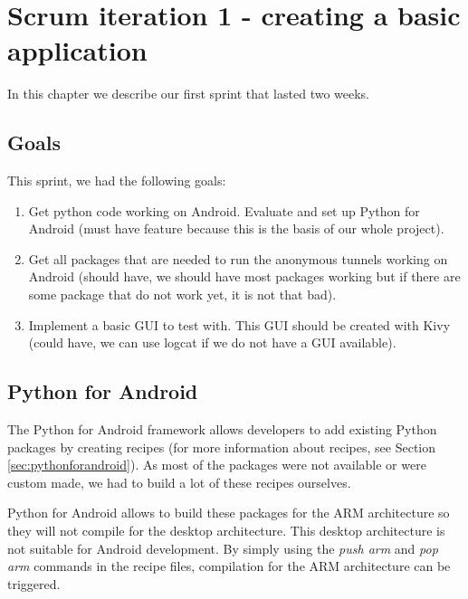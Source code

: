 \chapter{Scrum iteration 1 - creating a basic application}
\label{cpt:iteration1}
	In this chapter we describe our first sprint that lasted two weeks.

	\section{Goals}
		This sprint, we had the following goals:
	
		\begin{enumerate}
			\item Get python code working on Android. Evaluate and set up Python for Android (must have feature because this is the basis of our whole project).
			\item Get all packages that are needed to run the anonymous tunnels working on Android (should have, we should have most packages working but if there are some package that do not work yet, it is not that bad).
			\item Implement a basic GUI to test with. This GUI should be created with Kivy (could have, we can use logcat if we do not have a GUI available).
		\end{enumerate}
	
	\section{Python for Android}
		The Python for Android framework allows developers to add existing Python packages by creating recipes (for more information about recipes, see Section \ref{sec:pythonforandroid}). As most of the packages were not available or were custom made, we had to build a lot of these recipes ourselves.
	
		Python for Android allows to build these packages for the ARM architecture so they will not compile for the desktop architecture. This desktop architecture is not suitable for Android development. By simply using the \emph{push arm} and \emph{pop arm} commands in the recipe files, compilation for the ARM architecture can be triggered.
	
